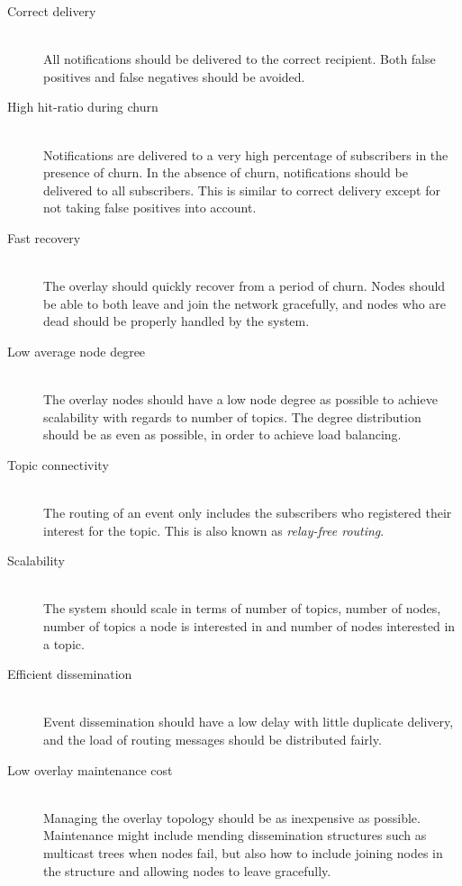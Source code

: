 \begin{description}

    \item[Correct delivery]\hfill\\
        All notifications should be delivered to the
        correct recipient. Both false positives and false negatives should be
        avoided.

    \item[High hit-ratio during churn]\hfill\\
        Notifications are delivered to a very high
        percentage of subscribers in the presence of churn. In the
        absence of churn, notifications should be delivered to all
        subscribers. This is similar to correct delivery except for
        not taking false positives into account.

    \item[Fast recovery]\hfill\\
        The overlay should quickly recover from a
        period of churn. Nodes should be able to both leave and join the
        network gracefully, and nodes who are dead should be properly
        handled by the system.

    \item[Low average node degree]\hfill\\
        The overlay nodes should have a low
        node degree as possible to achieve scalability with regards to number of
        topics. The degree distribution should be as even as possible,
        in order to achieve load balancing.

    \item[Topic connectivity]\hfill\\
        The routing of an event only includes the
        subscribers who registered their interest for the topic. This is
        also known as \emph{relay-free routing}.

    \item[Scalability]\hfill\\
        The system should scale in terms of number of
        topics, number of nodes, number of topics a node is interested in and
        number of nodes interested in a topic.

    \item[Efficient dissemination]\hfill\\
        Event dissemination should have a low
        delay with little duplicate delivery, and the load of routing messages
        should be distributed fairly.

    \item[Low overlay maintenance cost]\hfill\\
        Managing the overlay topology
        should be as inexpensive as possible. Maintenance might include mending
        dissemination structures such as multicast trees when nodes fail, but
        also how to include joining nodes in the structure and allowing nodes to
        leave gracefully.

\end{description}

